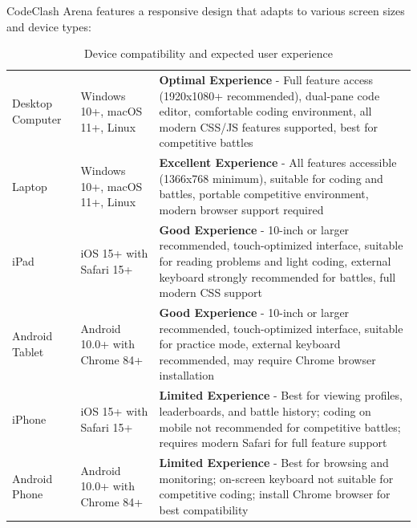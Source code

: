 \documentclass[12pt]{article}
\begin{document}
CodeClash Arena features a responsive design that adapts to various screen sizes and device types:

\begin{table}[ht]
\centering
\begin{tabularx}{\textwidth}{>{\raggedright\arraybackslash}p{2.2cm} >{\raggedright\arraybackslash}p{2.5cm} >{\raggedright\arraybackslash}X}
\toprule
\multicolumn{1}{c}{\textbf{Device Type}} &
\multicolumn{1}{c}{\textbf{Minimum OS/Browser}} &
\multicolumn{1}{c}{\textbf{User Experience Notes}} \\
\midrule
Desktop Computer & Windows 10+, macOS 11+, Linux & \textbf{Optimal Experience} - Full feature access (1920x1080+ recommended), dual-pane code editor, comfortable coding environment, all modern CSS/JS features supported, best for competitive battles \\ 
\vspace{0.3pt}Laptop & \vspace{0.3pt}Windows 10+, macOS 11+, Linux & \vspace{0.3pt}\textbf{Excellent Experience} - All features accessible (1366x768 minimum), suitable for coding and battles, portable competitive environment, modern browser support required \\ 
\vspace{0.3pt}iPad & \vspace{0.3pt}iOS 15+ with Safari 15+ & \vspace{0.3pt}\textbf{Good Experience} - 10-inch or larger recommended, touch-optimized interface, suitable for reading problems and light coding, external keyboard strongly recommended for battles, full modern CSS support \\ 
\vspace{0.3pt}Android Tablet & \vspace{0.3pt}Android 10.0+ with Chrome 84+ & \vspace{0.3pt}\textbf{Good Experience} - 10-inch or larger recommended, touch-optimized interface, suitable for practice mode, external keyboard recommended, may require Chrome browser installation \\ 
\vspace{0.3pt}iPhone & \vspace{0.3pt}iOS 15+ with Safari 15+ & \vspace{0.3pt}\textbf{Limited Experience} - Best for viewing profiles, leaderboards, and battle history; coding on mobile not recommended for competitive battles; requires modern Safari for full feature support \\ 
\vspace{0.3pt}Android Phone & \vspace{0.3pt}Android 10.0+ with Chrome 84+ & \vspace{0.3pt}\textbf{Limited Experience} - Best for browsing and monitoring; on-screen keyboard not suitable for competitive coding; install Chrome browser for best compatibility \\
\bottomrule
\end{tabularx}
\caption{Device compatibility and expected user experience}
\end{table}
\end{document}
